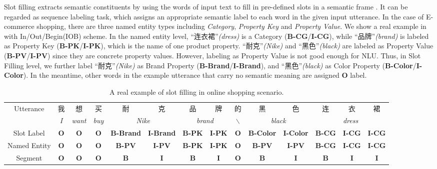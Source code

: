 Slot filling extracts semantic constituents
by using the words of input text to fill in pre-defined slots in 
a semantic frame \cite{mesnil2015using}.
It can be regarded as sequence labeling task,
which assigns an appropriate semantic label to each word in
the given input utterance. 
In the case of E-commerce shopping, 
there are three named entity types including 
\emph{Category}, \emph{Property Key} and \emph{Property Value}.
We show a real example in 
with In/Out/Begin(IOB) scheme.
In the named entity level,
``连衣裙''\emph{(dress)} is a Category (\textbf{B-CG}/\textbf{I-CG}),
while ``品牌''\emph{(brand)} is labeled as Property Key
(\textbf{B-PK}/\textbf{I-PK}),
which is the name of one product property.
``耐克''\emph{(Nike)} and ``黑色''\emph{(black)} are labeled as Property Value
(\textbf{B-PV}/\textbf{I-PV}) since they are concrete property values.
However, labeling as Property Value is not good enough for NLU.
Thus, in Slot Filling level, 
we further label ``耐克''\emph{(Nike)} as Brand Property (\textbf{B-Brand}/\textbf{I-Brand}), 
and ``黑色''\emph{(black)} as 
Color Property (\textbf{B-Color}/\textbf{I-Color}).
In the meantime, 
other words in the example utterance that carry no semantic meaning are assigned \textbf{O} label.
\begin{table*}[h]
	\caption{A real example of slot filling in online shopping scenario.}
	\label{tab:slot-filling-demo}
	\centering
	\scriptsize
	\begin{tabular}{c|c|c|c|c|c|c|c|c|c|c|c|c|c}
		\toprule
		\multirow{2}{*}{Utterance} & 我 & 想 & 买 & 耐 & 克 & 品 & 牌 & 的 & 黑 & 色 & 连 & 衣 & 裙 \\
		\cmidrule{2-14}
		& \em{I} & \em{want} & \em{buy} & \multicolumn{2}{c|}{\em{Nike}} & \multicolumn{2}{c|}{\em{brand}} & $\backslash$  & \multicolumn{2}{c|}{\em{black}} & \multicolumn{3}{c}{\em{dress}} \\
		\midrule
		Slot Label & \textbf{O} & \textbf{O} & \textbf{O} & \textbf{B-Brand} & \textbf{I-Brand} & \textbf{B-PK} & \textbf{I-PK} & \textbf{O} & \textbf{B-Color} & \textbf{I-Color} & \textbf{B-CG} & \textbf{I-CG} & \textbf{I-CG} \\
		\midrule
		Named Entity & \textbf{O} & \textbf{O} & \textbf{O} & \textbf{B-PV} & \textbf{I-PV} & \textbf{B-PK} & \textbf{I-PK} & \textbf{O} & \textbf{B-PV} & \textbf{I-PV} & \textbf{B-CG} & \textbf{I-CG} & \textbf{I-CG} \\
		\midrule
		Segment & \textbf{O} & \textbf{O} & \textbf{O} & \textbf{B} & \textbf{I} & \textbf{B} & \textbf{I} & \textbf{O} & \textbf{B} & \textbf{I} & \textbf{B} & \textbf{I} & \textbf{I} \\
		\bottomrule
	\end{tabular}
	\vspace{-10pt}
\end{table*}

